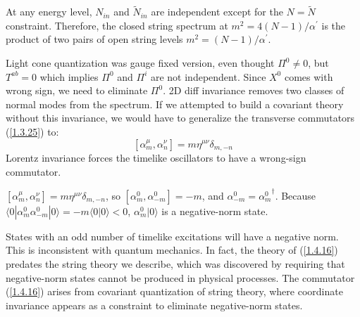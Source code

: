 At any energy level, $N_{in}$ and $\tilde{N}_{in}$ are independent except for the $N=\tilde{N}$ constraint. 
Therefore, the closed string spectrum at $m^{2}=4(N-1)/\alpha^{\prime}$ is the product of two pairs of open string levels $m^{2}=(N-1) / \alpha^{\prime}$. 

Light cone quantization was gauge fixed version, even thought $\Pi^0\ne0$, but $T^{ab}=0$ which implies $\Pi^0$ and $\Pi^i$ are not independent. Since $X^0$ comes with wrong sign, we need to eliminate $\Pi^0$. 2D diff invariance removes two classes of normal modes from the spectrum. If we attempted to build a covariant theory without this invariance, we would have to generalize the transverse commutators (\ref{1.3.25}) to: 
\begin{equation}
	\left[\alpha_{m}^{\mu}, \alpha_{n}^{\nu}\right]=m \eta^{\mu \nu} \delta_{m,-n} \label{1.4.16}
\end{equation}
Lorentz invariance forces the timelike oscillators to have a wrong-sign commutator. 
\begin{remark}
	$\left[\alpha_{m}^{\mu}, \alpha_{n}^{\nu}\right]=m \eta^{\mu \nu} \delta_{m,-n}$, so $\left[\alpha_{m}^{0}, \alpha_{-m}^{0}\right]=-m$, and
	$\alpha_{-m}^{0}={\alpha_{m}^{0}}^\dagger$. Because $\langle 0|\alpha_{m}^{0} \alpha_{-m}^{0}|  0\rangle=-m\langle 0\vert 0\rangle<0$, $\alpha_{m}^{0}\vert 0\rangle$ is a negative-norm state.
\end{remark}
\noindent States with an odd number of timelike excitations will have a negative norm. This is inconsistent with quantum mechanics. 
In fact, the theory of (\ref{1.4.16}) predates the string theory we describe, which was discovered by requiring that negative-norm states cannot be produced in physical processes. The commutator (\ref{1.4.16}) arises from covariant quantization of string theory, where coordinate invariance appears as a constraint to eliminate negative-norm states. 

